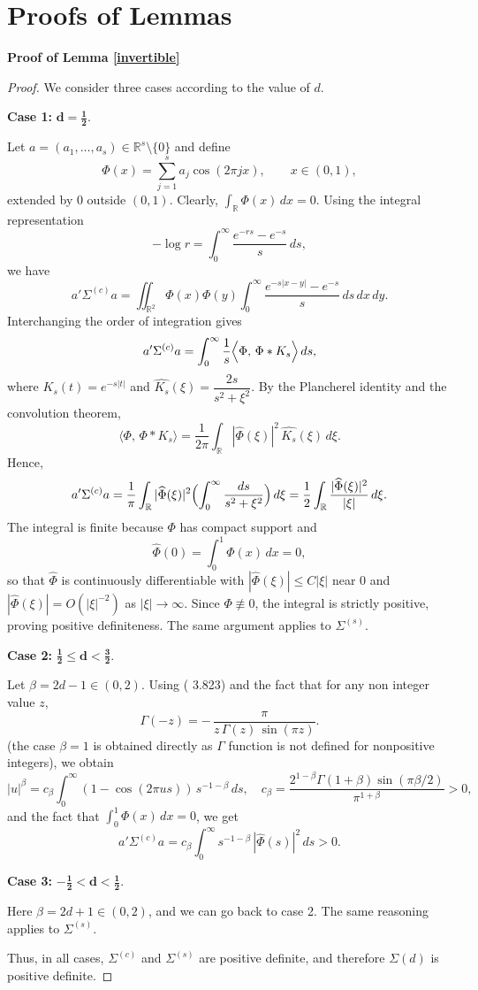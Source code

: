 \documentclass[12pt]{article}
\begin{document}
\section{Proofs of Lemmas}\label{proofs}
{\bf Proof of Lemma \ref{invertible}}
\begin{proof}
We consider three cases according to the value of $d$.

\medskip
\noindent
\textbf{Case 1:} $\mathbf{d=\tfrac{1}{2}}$.

Let $a=(a_1,\ldots,a_s)\in\mathbb{R}^s\setminus\{0\}$ and define
\[
\Phi(x) = \sum_{j=1}^{s} a_j \cos(2\pi jx), \qquad x\in(0,1),
\]
extended by $0$ outside $(0,1)$. Clearly, $\displaystyle \int_{\mathbb{R}}\Phi(x)\,dx=0$.  
Using the integral representation
\[
-\log r = \int_0^\infty \frac{e^{-rs}-e^{-s}}{s}\,ds,
\]
we have
\[
a'\Sigma^{(c)}a = \iint_{\mathbb{R}^2} \Phi(x)\Phi(y)
\!\int_0^\infty \frac{e^{-s|x-y|}-e^{-s}}{s}\,ds\,dx\,dy.
\]
Interchanging the order of integration gives
\[
a'\Sigma^{(c)}a = \int_0^\infty \frac{1}{s}
\Bigl\langle \Phi,\, \Phi*K_s \Bigr\rangle\,ds,
\]
where $K_s(t)=e^{-s|t|}$ and $\widehat{K_s}(\xi)=\dfrac{2s}{s^2+\xi^2}$.  
By the Plancherel identity and the convolution theorem,
\[
\langle \Phi,\,\Phi*K_s\rangle
= \frac{1}{2\pi}\int_{\mathbb{R}} |\widehat{\Phi}(\xi)|^2 \,\widehat{K_s}(\xi)\,d\xi.
\]
Hence,
\[
a'\Sigma^{(c)}a
= \frac{1}{\pi}\int_{\mathbb{R}} |\widehat{\Phi}(\xi)|^2
\Bigl(\int_0^\infty \frac{ds}{s^2+\xi^2}\Bigr)\,d\xi
= \frac{1}{2}\int_{\mathbb{R}}\frac{|\widehat{\Phi}(\xi)|^2}{|\xi|}\,d\xi.
\]
The integral is finite because $\Phi$ has compact support and
\[
\widehat{\Phi}(0)=\int_0^1\Phi(x)\,dx=0,
\]
so that $\widehat{\Phi}$ is continuously differentiable with
$|\widehat{\Phi}(\xi)|\le C|\xi|$ near $0$ and $|\widehat{\Phi}(\xi)|=O(|\xi|^{-2})$ as $|\xi|\to\infty$.  
Since $\Phi\not\equiv0$, the integral is strictly positive, proving positive definiteness.  
The same argument applies to $\Sigma^{(s)}$.

\medskip
\noindent
\textbf{Case 2:} $\mathbf{\tfrac{1}{2}\le d<\tfrac{3}{2}}$.

Let $\beta=2d-1\in(0,2)$.  Using  (\cite{gradshteyn2007tables} 3.823) and the fact that for any non integer value $z$,
\[
\Gamma(-z) = -\,\frac{\pi}{z\,\Gamma(z)\,\sin(\pi z)}.
\]
(the case $\beta=1$ is obtained directly as $\Gamma$  function is not defined for nonpositive integers), we obtain
\[
|u|^{\beta}
= c_\beta \int_0^\infty (1-\cos(2\pi us))\,s^{-1-\beta}\,ds,
\quad
c_\beta=\frac{2^{1-\beta}\Gamma(1+\beta)\sin(\pi\beta/2)}{\pi^{1+\beta}}>0,
\]
and the fact that $\int_0^1\Phi(x)\,dx=0$, we get
\[
a'\Sigma^{(c)}a
= c_\beta \int_0^\infty s^{-1-\beta}\,|\widehat{\Phi}(s)|^2\,ds > 0.
\]

\medskip
\noindent
\textbf{Case 3:} $\mathbf{-\tfrac{1}{2}<d<\tfrac{1}{2}}$.

Here $\beta=2d+1\in(0,2)$, and we can go back to case 2.
The same reasoning applies to $\Sigma^{(s)}$.

\smallskip
Thus, in all cases, $\Sigma^{(c)}$ and $\Sigma^{(s)}$ are positive definite, and therefore $\Sigma(d)$ is positive definite.
\end{proof}
\end{document}
